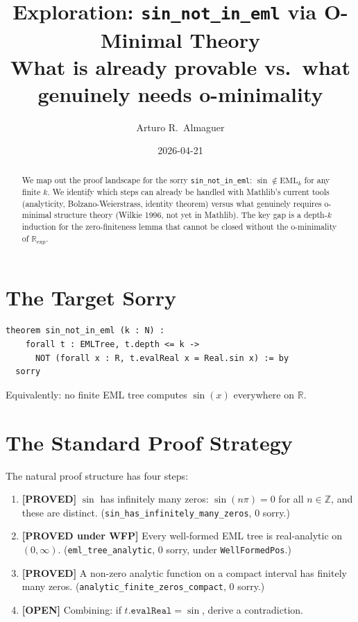 \documentclass[12pt]{article}
\title{\textbf{Exploration: \texttt{sin\_not\_in\_eml} via O-Minimal Theory}\\[0.4em]
\large What is already provable vs.\ what genuinely needs o-minimality}
\author{Arturo R.\ Almaguer}
\date{2026-04-21}
\begin{document}
\maketitle

\begin{abstract}
We map out the proof landscape for the sorry
\texttt{sin\_not\_in\_eml}: $\sin \notin \mathrm{EML}_k$ for any finite $k$.
We identify which steps can already be handled with Mathlib's current tools
(analyticity, Bolzano-Weierstrass, identity theorem) versus what genuinely
requires o-minimal structure theory (Wilkie 1996, not yet in Mathlib).
The key gap is a depth-$k$ induction for the zero-finiteness lemma
that cannot be closed without the o-minimality of $\mathbb{R}_{\exp}$.
\end{abstract}

\section{The Target Sorry}

\begin{verbatim}
theorem sin_not_in_eml (k : N) :
    forall t : EMLTree, t.depth <= k ->
      NOT (forall x : R, t.evalReal x = Real.sin x) := by
  sorry
\end{verbatim}

Equivalently: no finite EML tree computes $\sin(x)$ everywhere on $\mathbb{R}$.

\section{The Standard Proof Strategy}

The natural proof structure has four steps:

\begin{enumerate}
  \item \textbf{[PROVED]} $\sin$ has infinitely many zeros:
    $\sin(n\pi) = 0$ for all $n \in \mathbb{Z}$, and these are distinct.
    (\texttt{sin\_has\_infinitely\_many\_zeros}, 0 sorry.)

  \item \textbf{[PROVED under WFP]} Every well-formed EML tree is real-analytic on $(0,\infty)$.
    (\texttt{eml\_tree\_analytic}, 0 sorry, under \texttt{WellFormedPos}.)

  \item \textbf{[PROVED]} A non-zero analytic function on a compact interval has finitely many zeros.
    (\texttt{analytic\_finite\_zeros\_compact}, 0 sorry.)

  \item \textbf{[OPEN]} Combining: if $t.\mathtt{evalReal} = \sin$, derive a contradiction.
\end{enumerate}
\end{document}
